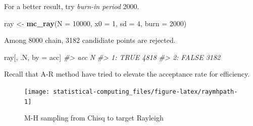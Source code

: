 \documentclass[]{book}
\newenvironment{Shaded}{\begin{snugshade}}{\end{snugshade}}
\newcommand{\CommentTok}[1]{\textcolor[rgb]{0.56,0.35,0.01}{\textit{#1}}}
\newcommand{\DataTypeTok}[1]{\textcolor[rgb]{0.13,0.29,0.53}{#1}}
\newcommand{\DecValTok}[1]{\textcolor[rgb]{0.00,0.00,0.81}{#1}}
\newcommand{\KeywordTok}[1]{\textcolor[rgb]{0.13,0.29,0.53}{\textbf{#1}}}
\newcommand{\NormalTok}[1]{#1}
\newcommand{\OperatorTok}[1]{\textcolor[rgb]{0.81,0.36,0.00}{\textbf{#1}}}
\newcommand{\StringTok}[1]{\textcolor[rgb]{0.31,0.60,0.02}{#1}}
\theoremstyle{definition}
\theoremstyle{definition}
\theoremstyle{definition}
\theoremstyle{remark}
\begin{document}
For a better result, try \emph{burn-in period} 2000.

\begin{Shaded}
\begin{Highlighting}[]
\NormalTok{ray <-}\StringTok{ }\KeywordTok{mc_ray}\NormalTok{(}\DataTypeTok{N =} \DecValTok{10000}\NormalTok{, }\DataTypeTok{x0 =} \DecValTok{1}\NormalTok{, }\DataTypeTok{sd =} \DecValTok{4}\NormalTok{, }\DataTypeTok{burn =} \DecValTok{2000}\NormalTok{)}
\end{Highlighting}
\end{Shaded}

Among 8000 chain, 3182 candidiate points are rejected.

\begin{Shaded}
\begin{Highlighting}[]
\NormalTok{ray[,}
\NormalTok{    .N,}
\NormalTok{    by =}\StringTok{ }\NormalTok{acc]}
\CommentTok{#>      acc    N}
\CommentTok{#> 1:  TRUE 4818}
\CommentTok{#> 2: FALSE 3182}
\end{Highlighting}
\end{Shaded}

Recall that A-R method have tried to elevate the acceptance rate for efficiency.

\begin{Shaded}
\end{Shaded}

\begin{figure}[H]

{\centering \texttt{[image: statistical-computing\_files/figure-latex/raymhpath-1]} 

}

\caption{M-H sampling from Chisq to target Rayleigh}\label{fig:raymhpath}
\end{figure}
\end{document}
